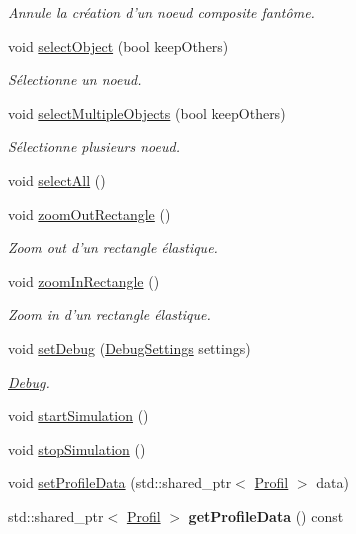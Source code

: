 \begin{DoxyCompactItemize}
\begin{DoxyCompactList}\small\item\em Annule la création d'un noeud composite fantôme. \end{DoxyCompactList}\item 
void \hyperlink{group__inf2990_gaa1eea4eb52c6ec22980e0b21e2bdbcd4}{select\-Object} (bool keep\-Others)
\begin{DoxyCompactList}\small\item\em Sélectionne un noeud. \end{DoxyCompactList}\item 
void \hyperlink{group__inf2990_ga7cbdab19081ab5e385cff2862e0642cd}{select\-Multiple\-Objects} (bool keep\-Others)
\begin{DoxyCompactList}\small\item\em Sélectionne plusieurs noeud. \end{DoxyCompactList}\item 
void \hyperlink{group__inf2990_ga91c3543726ad826767a5f1fdd42138f8}{select\-All} ()
\item 
void \hyperlink{group__inf2990_ga9b2a60b7b9392f6284e2fb7560e9c7f8}{zoom\-Out\-Rectangle} ()
\begin{DoxyCompactList}\small\item\em Zoom out d'un rectangle élastique. \end{DoxyCompactList}\item 
void \hyperlink{group__inf2990_ga10c88f159ad8d8ff9b17927d7ca50a0e}{zoom\-In\-Rectangle} ()
\begin{DoxyCompactList}\small\item\em Zoom in d'un rectangle élastique. \end{DoxyCompactList}\item 
void \hyperlink{group__inf2990_gac2d5a39c52437e295131acc35834be37}{set\-Debug} (\hyperlink{struct_debug_settings}{Debug\-Settings} settings)
\begin{DoxyCompactList}\small\item\em \hyperlink{class_debug}{Debug}. \end{DoxyCompactList}\item 
void \hyperlink{group__inf2990_ga740a421946d07eead14da960843da348}{start\-Simulation} ()
\item 
void \hyperlink{group__inf2990_gab38182bf38d343b899e9e9ee533529d9}{stop\-Simulation} ()
\item 
void \hyperlink{group__inf2990_ga5c5c0316590a27089e3d97b0d4b65c62}{set\-Profile\-Data} (std\-::shared\-\_\-ptr$<$ \hyperlink{struct_profil}{Profil} $>$ data)
\item 
\hypertarget{class_facade_modele_a33dec9f7c896c4a465556c61298c74d0}{std\-::shared\-\_\-ptr$<$ \hyperlink{struct_profil}{Profil} $>$ {\bfseries get\-Profile\-Data} () const }\label{class_facade_modele_a33dec9f7c896c4a465556c61298c74d0}


\end{DoxyCompactItemize}
